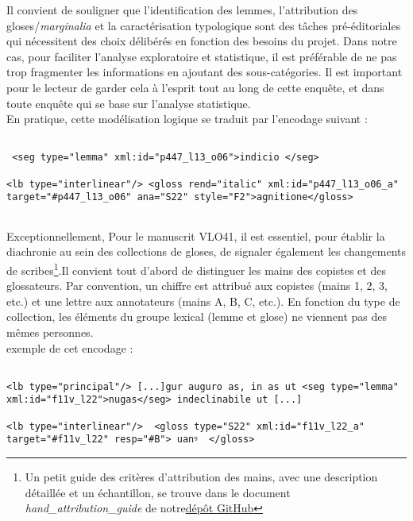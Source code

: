 \documentclass[a4paper, twoside, 12pt]{book}
\begin{document}
Il convient de souligner que l'identification des lemmes, l'attribution des gloses/\textit{marginalia} et la caractérisation typologique sont des tâches pré-éditoriales qui nécessitent des choix délibérés en fonction des besoins du projet. Dans notre cas, pour faciliter l'analyse exploratoire et statistique, il est préférable de ne pas trop fragmenter les informations en ajoutant des sous-catégories. Il est important pour le lecteur de garder cela à l'esprit tout au long de cette enquête, et dans toute enquête qui se base sur l'analyse statistique.\\

En pratique, cette modélisation logique se traduit par l'encodage suivant :


\begin{verbatim}

 <seg type="lemma" xml:id="p447_l13_o06">indicio </seg> 

<lb type="interlinear"/> <gloss rend="italic" xml:id="p447_l13_o06_a" 
target="#p447_l13_o06" ana="S22" style="F2">agnitione</gloss>
    
\end{verbatim}


Exceptionnellement, Pour le manuscrit VLO41, il est essentiel, pour établir la diachronie au sein des collections de gloses, de signaler également les changements de scribes\footnote{Un petit guide des critères d'attribution des mains, avec une description détaillée et un échantillon, se trouve dans le document \textit{hand\_attribution\_guide} de notre\href{https://github.com/malamatenia/Eutyches/blob/main/VLO41/hand_attribution_guide.pdf}{dépôt GitHub}}.Il convient tout d'abord de distinguer les mains des copistes et des glossateurs. Par convention, un chiffre est attribué aux copistes (mains 1, 2, 3, etc.) et une lettre aux annotateurs (mains A, B, C, etc.). En fonction du type de collection, les éléments du groupe lexical (lemme et glose) ne viennent pas des mêmes personnes.\\

exemple de cet encodage :

\begin{verbatim}

<lb type="principal"/> [...]gur auguro as, in as ut <seg type="lemma" 
xml:id="f11v_l22">nugas</seg> indeclinabile ut [...] 

<lb type="interlinear"/>  <gloss type="S22" xml:id="f11v_l22_a" 
target="#f11v_l22" resp="#B"> uanꝰ  </gloss> 

\end{verbatim} 
\end{document}
